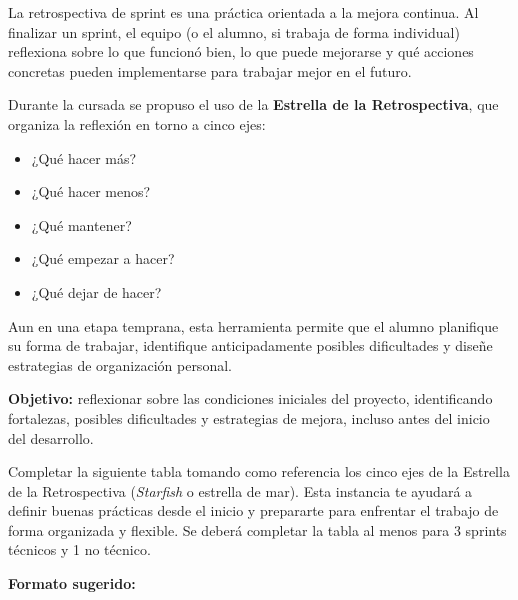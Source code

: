 \documentclass[
11pt, %
]{charter}
\begin{document}
La retrospectiva de sprint es una práctica orientada a la mejora continua. Al finalizar un sprint, el equipo (o el alumno, si trabaja de forma individual) reflexiona sobre lo que funcionó bien, lo que puede mejorarse y qué acciones concretas pueden implementarse para trabajar mejor en el futuro.

Durante la cursada se propuso el uso de la \textbf{Estrella de la Retrospectiva}, que organiza la reflexión en torno a cinco ejes:

\begin{itemize}
\item  ¿Qué hacer más?
\item  ¿Qué hacer menos?
\item  ¿Qué mantener?
\item  ¿Qué empezar a hacer?
\item  ¿Qué dejar de hacer?
\end{itemize}

Aun en una etapa temprana, esta herramienta permite que el alumno planifique su forma de trabajar, identifique anticipadamente posibles dificultades y diseñe estrategias de organización personal.

\textbf{Objetivo:} reflexionar sobre las condiciones iniciales del proyecto, identificando fortalezas, posibles dificultades y estrategias de mejora, incluso antes del inicio del desarrollo.


Completar la siguiente tabla tomando como referencia los cinco ejes de la Estrella de la Retrospectiva (\emph{Starfish} o estrella de mar). Esta instancia te ayudará a definir buenas prácticas desde el inicio y prepararte para enfrentar el trabajo de forma organizada y flexible. Se deberá completar la tabla al menos para 3 sprints técnicos y 1 no técnico.

\textbf{Formato sugerido:}
\end{document}
